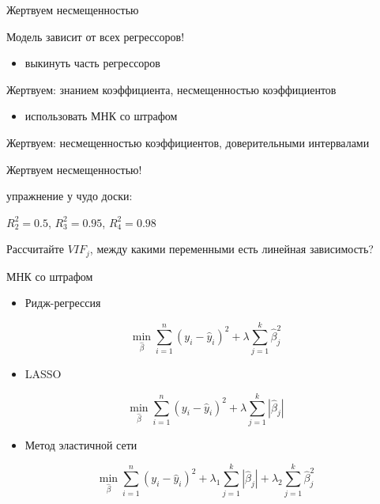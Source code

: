 \documentclass[ignorenonframetext,]{beamer}
\begin{document}
\begin{frame}{Жертвуем несмещенностью}

Модель зависит от всех регрессоров!

\begin{itemize}
\itemsep1pt\parskip0pt
\item
  выкинуть часть регрессоров
\end{itemize}

Жертвуем: знанием коэффициента, несмещенностью коэффициентов

\begin{itemize}
\itemsep1pt\parskip0pt
\item
  использовать МНК со штрафом
\end{itemize}

Жертвуем: несмещенностью коэффициентов, доверительными интервалами

Жертвуем несмещенностью!

\end{frame}

\begin{frame}{упражнение у чудо доски:}

\(R^2_2=0.5\), \(R^2_3=0.95\), \(R^2_4=0.98\)

Рассчитайте \(VIF_j\), между какими переменными есть линейная
зависимость?

\end{frame}

\begin{frame}{МНК со штрафом}

\begin{itemize}
\itemsep1pt\parskip0pt
\item
  Ридж-регрессия
\end{itemize}

\[
\min_{\hat{\beta}} \sum_{i=1}^n (y_i-\hat{y}_i)^2 + \lambda \sum_{j=1}^k \hat{\beta}_j^2
\]

\begin{itemize}
\itemsep1pt\parskip0pt
\item
  LASSO
\end{itemize}

\[
\min_{\hat{\beta}} \sum_{i=1}^n (y_i-\hat{y}_i)^2 + \lambda \sum_{j=1}^k |\hat{\beta}_j|
\]

\begin{itemize}
\itemsep1pt\parskip0pt
\item
  Метод эластичной сети
\end{itemize}

\[
\min_{\hat{\beta}} \sum_{i=1}^n (y_i-\hat{y}_i)^2 + \lambda_1 \sum_{j=1}^k |\hat{\beta}_j| + \lambda_2 \sum_{j=1}^k \hat{\beta}_j^2
\]

\end{frame}
\end{document}
